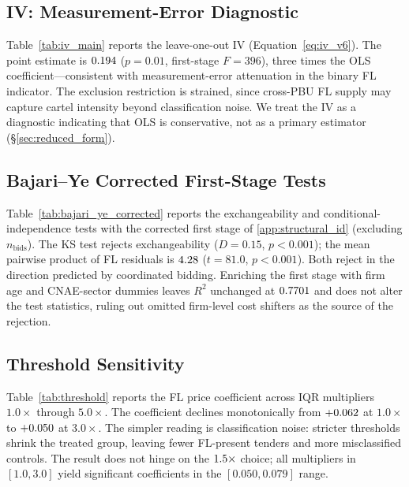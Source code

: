 

\subsection{IV: Measurement-Error Diagnostic}

Table~\ref{tab:iv_main} reports the leave-one-out IV
(Equation~\eqref{eq:iv_v6}). The point estimate is $0.194$
($p = 0.01$, first-stage $F = 396$), three times the OLS
coefficient---consistent with measurement-error attenuation in
the binary FL indicator. The exclusion restriction is strained,
since cross-PBU FL supply may capture cartel intensity beyond
classification noise. We treat the IV as a diagnostic
indicating that OLS is conservative, not as a primary
estimator (\S\ref{sec:reduced_form}).



\subsection{Bajari--Ye Corrected First-Stage Tests}

Table~\ref{tab:bajari_ye_corrected} reports the
\citet{bajari2003deciding} exchangeability and conditional-independence
tests with the corrected first stage of \ref{app:structural_id}
(excluding $n_{\mathrm{bids}}$). The KS test rejects
exchangeability ($D = 0.15$, $p < 0.001$); the mean pairwise
product of FL residuals is $4.28$ ($t = 81.0$, $p < 0.001$).
Both reject in the direction predicted by coordinated bidding.
Enriching the first stage with firm age and CNAE-sector dummies
leaves $R^2$ unchanged at $0.7701$ and does not alter the test
statistics, ruling out omitted firm-level cost shifters as
the source of the rejection.



\subsection{Threshold Sensitivity}
\label{app:threshold_sens}

Table~\ref{tab:threshold} reports the FL price coefficient
across IQR multipliers $1.0\times$ through $5.0\times$. The
coefficient declines monotonically from $+0.062$ at $1.0\times$
to $+0.050$ at $3.0\times$. The simpler reading is
classification noise: stricter thresholds shrink the treated
group, leaving fewer FL-present tenders and more misclassified
controls. The result does not hinge on the $1.5\times$ choice;
all multipliers in $[1.0, 3.0]$ yield significant coefficients
in the $[0.050, 0.079]$ range.

